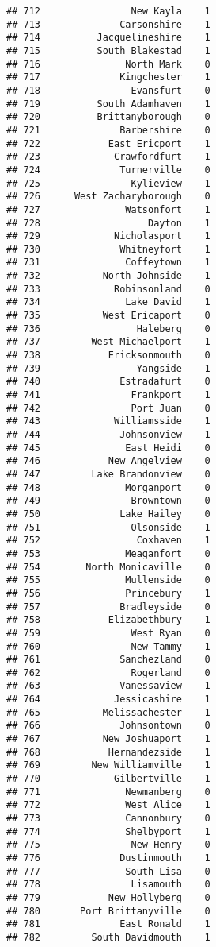 \documentclass[
]{article}
\begin{document}
\begin{verbatim}
## 712                New Kayla    1
## 713              Carsonshire    1
## 714          Jacquelineshire    1
## 715          South Blakestad    1
## 716               North Mark    0
## 717              Kingchester    1
## 718                Evansfurt    0
## 719          South Adamhaven    1
## 720          Brittanyborough    0
## 721              Barbershire    0
## 722            East Ericport    1
## 723             Crawfordfurt    1
## 724              Turnerville    0
## 725                Kylieview    1
## 726      West Zacharyborough    0
## 727               Watsonfort    1
## 728                   Dayton    1
## 729             Nicholasport    1
## 730              Whitneyfort    1
## 731               Coffeytown    1
## 732           North Johnside    1
## 733             Robinsonland    0
## 734               Lake David    1
## 735           West Ericaport    0
## 736                 Haleberg    0
## 737         West Michaelport    1
## 738            Ericksonmouth    0
## 739                 Yangside    1
## 740              Estradafurt    0
## 741                Frankport    1
## 742                Port Juan    0
## 743             Williamsside    1
## 744              Johnsonview    1
## 745               East Heidi    0
## 746            New Angelview    0
## 747         Lake Brandonview    0
## 748               Morganport    0
## 749                Browntown    0
## 750              Lake Hailey    0
## 751                Olsonside    1
## 752                 Coxhaven    1
## 753               Meaganfort    0
## 754        North Monicaville    0
## 755               Mullenside    0
## 756               Princebury    1
## 757              Bradleyside    0
## 758            Elizabethbury    1
## 759                West Ryan    0
## 760                New Tammy    1
## 761              Sanchezland    0
## 762                Rogerland    0
## 763              Vanessaview    1
## 764             Jessicashire    1
## 765           Melissachester    1
## 766              Johnsontown    0
## 767           New Joshuaport    1
## 768            Hernandezside    1
## 769         New Williamville    1
## 770             Gilbertville    1
## 771               Newmanberg    0
## 772               West Alice    1
## 773               Cannonbury    0
## 774               Shelbyport    1
## 775                New Henry    0
## 776              Dustinmouth    1
## 777               South Lisa    0
## 778                Lisamouth    0
## 779            New Hollyberg    0
## 780       Port Brittanyville    0
## 781              East Ronald    1
## 782         South Davidmouth    1

\end{verbatim}
\end{document}
